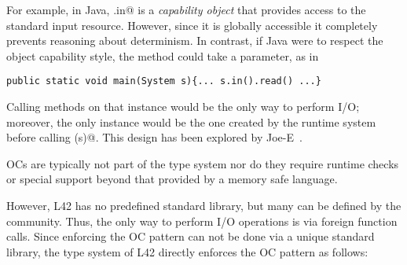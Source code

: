 


\lstset{language=Java}
 For example, in Java, \Q@System.in@%
 \lstset{language=FortyTwo}
 is a \emph{capability object} that provides access to the standard input resource. However, since it is globally accessible it completely prevents reasoning about determinism. 
In contrast, if Java were to respect the object capability style, the \Q@main@ method could take a \Q@System@ parameter, as in
\lstset{language=Java}
\begin{lstlisting}
public static void main(System s){... s.in().read() ...}
\end{lstlisting}
\lstset{language=FortyTwo}
Calling methods on that \Q@System@ instance would be the only way to perform I/O;
moreover, the only \Q@System@ instance would be the one created by the runtime system before calling \Q@main(s)@. %
This design has been explored by Joe-E~\cite{finifter2008verifiable}.


OCs are typically not part of the type system nor do they require runtime checks or special support beyond that provided by a memory safe language. 

However, L42 has no predefined standard library, but many can be defined by the community.
Thus, the only way to perform I/O operations is via foreign function calls.
Since enforcing the OC pattern can not be done via a unique standard library, the type system of L42 directly enforces the OC pattern as follows:


